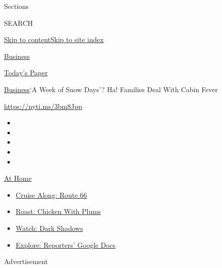 Sections

SEARCH

\protect\hyperlink{site-content}{Skip to
content}\protect\hyperlink{site-index}{Skip to site index}

\href{https://www.nytimes3xbfgragh.onion/section/business}{Business}

\href{https://myaccount.nytimes3xbfgragh.onion/auth/login?response_type=cookie\&client_id=vi}{}

\href{https://www.nytimes3xbfgragh.onion/section/todayspaper}{Today's
Paper}

\href{/section/business}{Business}\textbar{}`A Week of Snow Days'? Ha!
Families Deal With Cabin Fever

\url{https://nyti.ms/3bm8Jpp}

\begin{itemize}
\item
\item
\item
\item
\item
\end{itemize}

\href{https://www.nytimes3xbfgragh.onion/spotlight/at-home?action=click\&pgtype=Article\&state=default\&region=TOP_BANNER\&context=at_home_menu}{At
Home}

\begin{itemize}
\tightlist
\item
  \href{https://www.nytimes3xbfgragh.onion/2020/09/07/travel/route-66.html?action=click\&pgtype=Article\&state=default\&region=TOP_BANNER\&context=at_home_menu}{Cruise
  Along: Route 66}
\item
  \href{https://www.nytimes3xbfgragh.onion/2020/09/04/dining/sheet-pan-chicken.html?action=click\&pgtype=Article\&state=default\&region=TOP_BANNER\&context=at_home_menu}{Roast:
  Chicken With Plums}
\item
  \href{https://www.nytimes3xbfgragh.onion/2020/09/04/arts/television/dark-shadows-stream.html?action=click\&pgtype=Article\&state=default\&region=TOP_BANNER\&context=at_home_menu}{Watch:
  Dark Shadows}
\item
  \href{https://www.nytimes3xbfgragh.onion/interactive/2020/at-home/even-more-reporters-editors-diaries-lists-recommendations.html?action=click\&pgtype=Article\&state=default\&region=TOP_BANNER\&context=at_home_menu}{Explore:
  Reporters' Google Docs}
\end{itemize}

Advertisement

